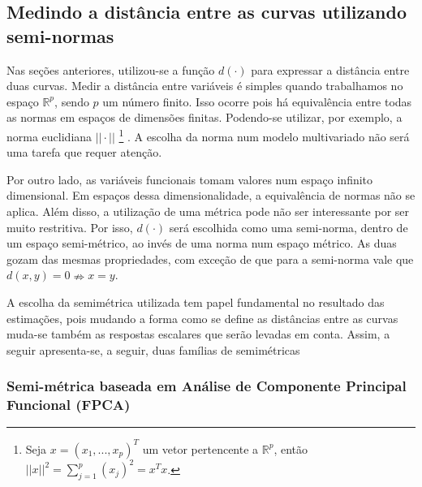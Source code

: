\documentclass[
	12pt,				%
	openright,			%
	oneside,			%
	a4paper,			%
	english,			%
	brazil				%
	]{dissertacao-ufrgs-abntex2}
\begin{document}
\subsection{Medindo a distância entre as curvas utilizando semi-normas}

Nas seções anteriores, utilizou-se a função $d(\cdot)$ para expressar
a distância entre duas curvas. Medir a distância entre variáveis é
simples quando trabalhamos no espaço $\mathbb{R}^{p}$, sendo $p$
um número finito. Isso ocorre pois há equivalência entre todas as
normas em espaços de dimensões finitas. Podendo-se utilizar, por exemplo,
a norma euclidiana $||\cdot||$%
\footnote{Seja $x=(x_{1},...,x_{p})^{T}$ um vetor pertencente a $\mathbb{R}^{p}$,
então$||x||^{2}=\sum_{j=1}^{p}(x_{j})^{2}=x^{T}x$.%
} . A escolha da norma num modelo multivariado não será uma tarefa
que requer atenção.

Por outro lado, as variáveis funcionais tomam valores num espaço infinito
dimensional. Em espaços dessa dimensionalidade, a equivalência de normas não se
aplica. Além disso, a utilização de uma métrica pode não ser interessante
por ser muito restritiva. Por isso, $d(\cdot)$ será escolhida como
uma semi-norma, dentro de um espaço semi-métrico, ao invés de uma
norma num espaço métrico. As duas gozam das mesmas propriedades, com
exceção de que para a semi-norma vale que $d(x,y)=0\nRightarrow x=y$. 

A escolha da semimétrica utilizada tem papel fundamental no resultado das estimações, pois mudando a forma como se define as distâncias entre as curvas muda-se também as respostas escalares que serão levadas em conta. Assim, a seguir apresenta-se, a seguir, duas famílias de semimétricas

\subsubsection*{Semi-métrica baseada em Análise de Componente Principal Funcional
(FPCA)}
\end{document}
